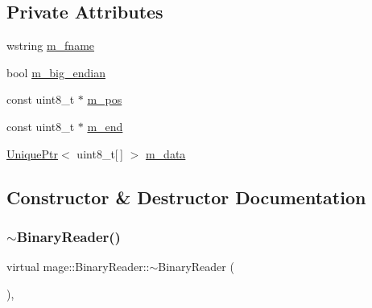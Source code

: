 \subsection*{Private Attributes}
\begin{DoxyCompactItemize}
\item 
wstring \hyperlink{classmage_1_1_binary_reader_a9c97c02d53ce60a9952751ad4f55414f}{m\+\_\+fname}
\item 
bool \hyperlink{classmage_1_1_binary_reader_a8d23fde958e08efe248edb5d92861113}{m\+\_\+big\+\_\+endian}
\item 
const uint8\+\_\+t $\ast$ \hyperlink{classmage_1_1_binary_reader_a086c8b8615dddb15a97acf657bb4d73b}{m\+\_\+pos}
\item 
const uint8\+\_\+t $\ast$ \hyperlink{classmage_1_1_binary_reader_a929b6480629014c24263ec3042b1f364}{m\+\_\+end}
\item 
\hyperlink{namespacemage_a8c307fbcc33bce9b7f2aa4c26c3b95cf}{Unique\+Ptr}$<$ uint8\+\_\+t\mbox{[}$\,$\mbox{]} $>$ \hyperlink{classmage_1_1_binary_reader_a34820a214a5b98e09beb12e8a465b0e3}{m\+\_\+data}
\end{DoxyCompactItemize}


\subsection{Constructor \& Destructor Documentation}
\hypertarget{classmage_1_1_binary_reader_aa300382cfa1585bb2f76c4e764bb5617}{}\label{classmage_1_1_binary_reader_aa300382cfa1585bb2f76c4e764bb5617} 
\subsubsection{\texorpdfstring{$\sim$\+Binary\+Reader()}{~BinaryReader()}}
{\footnotesize\ttfamily virtual mage\+::\+Binary\+Reader\+::$\sim$\+Binary\+Reader (\begin{DoxyParamCaption}{ }\end{DoxyParamCaption})\hspace{0.3cm}{\ttfamily [virtual]}, {\ttfamily [default]}}

\hypertarget{classmage_1_1_binary_reader_aab82579cef4f2f022273cf1adfcc8497}{}\label{classmage_1_1_binary_reader_aab82579cef4f2f022273cf1adfcc8497} 
